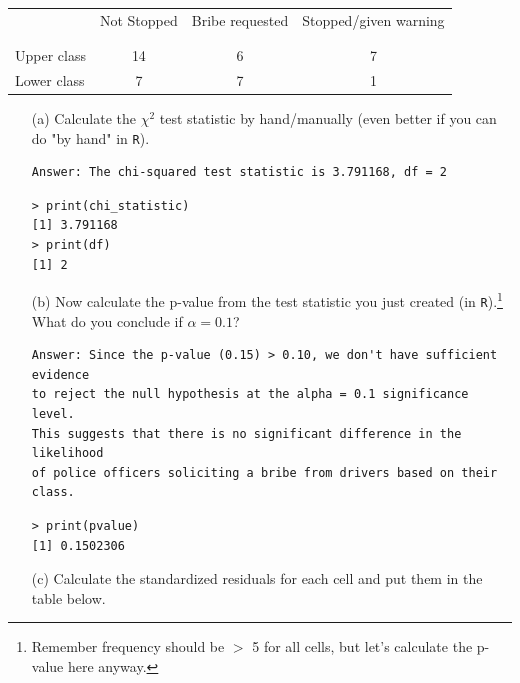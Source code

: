 \documentclass[12pt,letterpaper]{article}
\begin{document}
\begin{table}[h!]
	\centering
	\begin{tabular}{l | c c c }
		& Not Stopped & Bribe requested & Stopped/given warning \\
		\\[-1.8ex] 
		\hline \\[-1.8ex]
		Upper class & 14 & 6 & 7 \\
		Lower class & 7 & 7 & 1 \\
		\hline
	\end{tabular}
\end{table}
\newpage
\begin{enumerate}
	
	\item [(a)]
	Calculate the $\chi^2$ test statistic by hand/manually (even better if you can do "by hand" in \texttt{R}).\
\begin{verbatim}
Answer: The chi-squared test statistic is 3.791168, df = 2
\end{verbatim}
     
\begin{verbatim}
> print(chi_statistic)
[1] 3.791168
> print(df)
[1] 2
\end{verbatim}   
\newpage
	\item [(b)]
	Now calculate the p-value from the test statistic you just created (in \texttt{R}).\footnote{Remember frequency should be $>$ 5 for all cells, but let's calculate the p-value here anyway.}  What do you conclude if $\alpha = 0.1$?\
\begin{verbatim}
Answer: Since the p-value (0.15) > 0.10, we don't have sufficient evidence 
to reject the null hypothesis at the alpha = 0.1 significance level. 
This suggests that there is no significant difference in the likelihood 
of police officers soliciting a bribe from drivers based on their class.
\end{verbatim} 
	\noindent 
	 
\begin{verbatim}
> print(pvalue)
[1] 0.1502306
\end{verbatim}

	\item [(c)] Calculate the standardized residuals for each cell and put them in the table below.


\end{enumerate}
\end{document}
